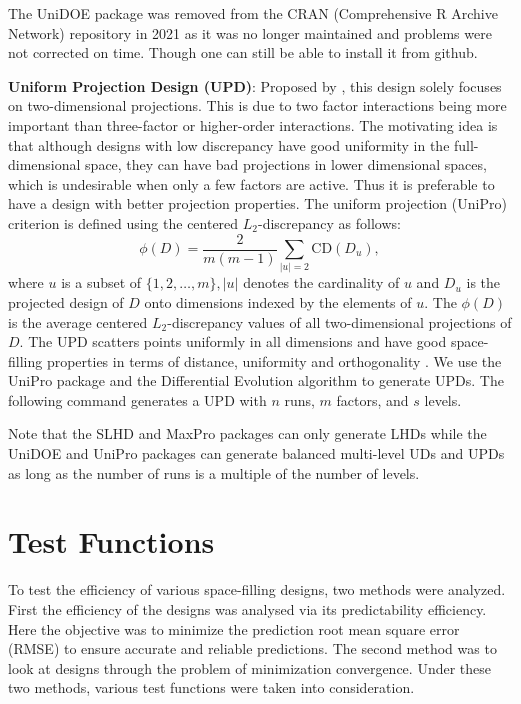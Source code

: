 \documentclass [PhD] {package/uclathes}
\begin{document}
The UniDOE package was removed from the CRAN (Comprehensive R Archive Network) repository in 2021 as it was no longer maintained and problems were not corrected on time. Though one can still be able to install it from github.

\textbf{Uniform Projection Design (UPD)}:
Proposed by \textcite{sun2019uniform}, this design solely focuses on  two-dimensional projections. This is due to two factor interactions being more important than three-factor or higher-order interactions. The motivating idea is that although designs with low discrepancy have good uniformity in the full-dimensional space, they can have bad projections in lower dimensional spaces, which is undesirable when only a few factors are active. Thus it is preferable to have a design with better projection properties. The uniform projection (UniPro) criterion  is defined using the centered $L_2$-discrepancy as follows:
\begin{equation}\label{eqn:UniPro}
  \phi(D)=\frac{2}{m(m-1)} \sum_{|u|=2} \mathrm{CD}\left(D_u\right),
\end{equation}
where $u$ is a subset of $\{1,2, \ldots, m\},|u|$ denotes the cardinality of $u$ and $D_u$ is the projected design of $D$ onto dimensions indexed by the elements of $u$. The $\phi(D)$ is the average centered $L_2$-discrepancy values of all two-dimensional projections of $D$. The UPD scatters points uniformly in all dimensions and have good space-filling properties in terms of distance, uniformity and orthogonality \parencite{sun2019uniform}. We use the UniPro package and the Differential Evolution algorithm to generate UPDs. The following command generates a UPD with $n$ runs, $m$ factors, and $s$ levels.
\begin{Schunk}
\end{Schunk}
Note that the SLHD and MaxPro packages can only generate LHDs while the UniDOE and UniPro packages can generate balanced multi-level UDs and UPDs as long as the number of runs is a multiple of the number of levels.

\section{Test Functions}
To test the efficiency of various space-filling designs, two methods were analyzed. First the efficiency of the designs was analysed via its predictability efficiency. Here the objective was  to minimize the prediction root mean square error (RMSE) to ensure accurate and reliable predictions. The second method was to look at designs through the problem of minimization convergence. Under these two methods, various test functions were taken into consideration.
\end{document}
